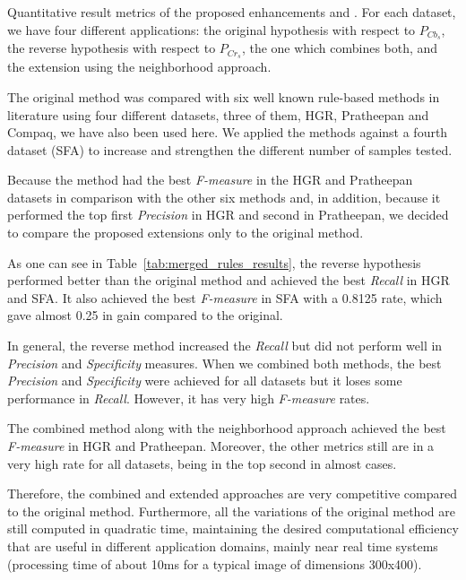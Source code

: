 \begin{table}[ht]
\caption[Quantitative result metrics of the proposed enhancements and original method]{Quantitative result metrics of the proposed enhancements and \citet{brancati:17}. For each dataset, we have four different applications: the original hypothesis with respect to $P_{Cb_{s}}$, the reverse hypothesis with respect to $P_{Cr_{s}}$, the one which combines both, and the extension using the neighborhood approach.}
\label{tab:merged_rules_results}

\end{table}

The original method was compared with six well known rule-based methods in literature using four different datasets, three of them, HGR, Pratheepan and Compaq, we have also been used here. We applied the methods against a fourth dataset (SFA) to increase and strengthen the different number of samples tested.

Because the method had the best \textit{F-measure} in the HGR and Pratheepan datasets in comparison with the other six methods and, in addition, because it performed the top first \textit{Precision} in HGR and  second in Pratheepan, we decided to compare the proposed extensions only to the original method.

As one can see in Table~\ref{tab:merged_rules_results}, the reverse hypothesis performed better than the original method and achieved the best \textit{Recall} in HGR and SFA. It also achieved the best \textit{F-measure} in SFA with a 0.8125 rate, which gave almost 0.25 in gain compared to the original.

In general, the reverse method increased the \textit{Recall} but did not perform well in \textit{Precision} and \textit{Specificity} measures. When we combined both methods, the best \textit{Precision} and \textit{Specificity} were achieved for all datasets but it loses some performance in \textit{Recall}. However, it has very high \textit{F-measure} rates.

The combined method along with the neighborhood approach achieved the best \textit{F-measure} in HGR and Pratheepan. Moreover, the other metrics still are in a very high rate for all datasets, being in the top second in almost cases.

Therefore, the combined and extended approaches are very competitive compared to the original method. Furthermore, all the variations of the original method are still computed in quadratic time, maintaining the desired computational efficiency that are useful in different application domains, mainly near real time systems (processing time of about 10ms for a typical image of dimensions 300x400).

